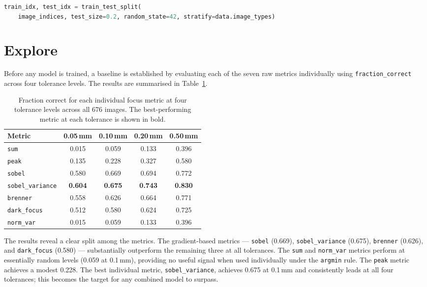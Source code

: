 \documentclass{article}
\begin{document}
\begin{lstlisting}[language=Python, caption={Snippet of code from $ridge\_regression.py$ \cite{Ridge}}, basicstyle=\ttfamily\small, frame=single, breaklines=true]
    train_idx, test_idx = train_test_split(
    image_indices, test_size=0.2, random_state=42, stratify=data.image_types)
\end{lstlisting}

\section{Explore}

Before any model is trained, a baseline is established by evaluating each of the seven raw metrics individually using \texttt{fraction\_correct} across four tolerance levels. The results are summarised in Table~\ref{tab:baseline}.

\begin{table}[htbp]
    \centering
    \caption{Fraction correct for each individual focus metric at four tolerance levels across all 676 images. The best-performing metric at each tolerance is shown in bold.}
    \begin{tabular}{lcccc}
        \toprule
        Metric & 0.05\,mm & 0.10\,mm & 0.20\,mm & 0.50\,mm \\
        \midrule
        \texttt{sum}             & 0.015 & 0.059 & 0.133 & 0.396 \\
        \texttt{peak}            & 0.135 & 0.228 & 0.327 & 0.580 \\
        \texttt{sobel}           & 0.580 & 0.669 & 0.694 & 0.772 \\
        \texttt{sobel\_variance} & \textbf{0.604} & \textbf{0.675} & \textbf{0.743} & \textbf{0.830} \\
        \texttt{brenner}         & 0.558 & 0.626 & 0.664 & 0.771 \\
        \texttt{dark\_focus}     & 0.512 & 0.580 & 0.624 & 0.725 \\
        \texttt{norm\_var}       & 0.015 & 0.059 & 0.133 & 0.396 \\
        \bottomrule
    \end{tabular}
    \label{tab:baseline}
\end{table}

The results reveal a clear split among the metrics. The gradient-based metrics --- \texttt{sobel} (0.669), \texttt{sobel\_variance} (0.675), \texttt{brenner} (0.626), and \texttt{dark\_focus} (0.580) --- substantially outperform the remaining three at all tolerances. The \texttt{sum} and \texttt{norm\_var} metrics perform at essentially random levels (0.059 at 0.1\,mm), providing no useful signal when used individually under the \texttt{argmin} rule. The \texttt{peak} metric achieves a modest 0.228. The best individual metric, \texttt{sobel\_variance}, achieves 0.675 at 0.1\,mm and consistently leads at all four tolerances; this becomes the target for any combined model to surpass.
\end{document}
